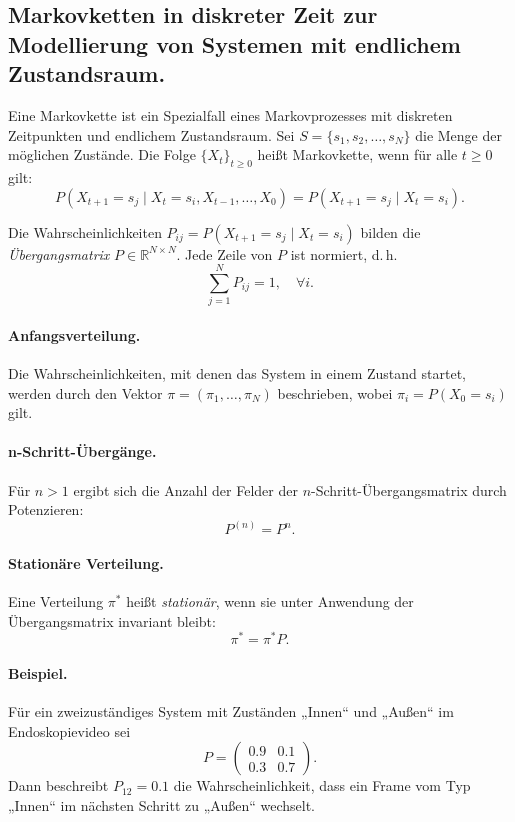 \subsection{Markovketten in diskreter Zeit zur Modellierung von Systemen mit endlichem Zustandsraum.}

Eine Markovkette ist ein Spezialfall eines Markovprozesses mit diskreten Zeitpunkten und endlichem Zustandsraum. 
Sei $S = \{s_1, s_2, \dots, s_N\}$ die Menge der möglichen Zustände.
Die Folge $\{X_t\}_{t \ge 0}$ heißt Markovkette, wenn für alle $t \ge 0$ gilt:
\begin{equation}
P(X_{t+1} = s_j \mid X_t = s_i, X_{t-1}, \dots, X_0)
= P(X_{t+1} = s_j \mid X_t = s_i).
\end{equation}

Die Wahrscheinlichkeiten $P_{ij} = P(X_{t+1} = s_j \mid X_t = s_i)$ bilden die
\emph{Übergangsmatrix} $P \in \mathbb{R}^{N \times N}$.
Jede Zeile von $P$ ist normiert, d.\,h.
\begin{equation}
\sum_{j=1}^{N} P_{ij} = 1, \quad \forall i.
\end{equation}

\paragraph{Anfangsverteilung.}
Die Wahrscheinlichkeiten, mit denen das System in einem Zustand startet, werden durch den Vektor $\pi = (\pi_1, \ldots, \pi_N)$ beschrieben, wobei $\pi_i = P(X_0 = s_i)$ gilt.

\paragraph{n-Schritt-Übergänge.}
Für $n > 1$ ergibt sich die Anzahl der Felder der $n$-Schritt-Übergangsmatrix durch Potenzieren:
\begin{equation}
P^{(n)} = P^n.
\end{equation}

\paragraph{Stationäre Verteilung.}
Eine Verteilung $\pi^*$ heißt \emph{stationär}, wenn sie unter Anwendung der Übergangsmatrix invariant bleibt:
\begin{equation}
\pi^* = \pi^* P.
\end{equation}

\paragraph{Beispiel.}
Für ein zweizuständiges System mit Zuständen „Innen“ und „Außen“ im Endoskopievideo sei
\[
P = \begin{pmatrix}
0.9 & 0.1 \\
0.3 & 0.7
\end{pmatrix}.
\]
Dann beschreibt $P_{12} = 0.1$ die Wahrscheinlichkeit, dass ein Frame vom Typ „Innen“ im nächsten Schritt zu „Außen“ wechselt.


